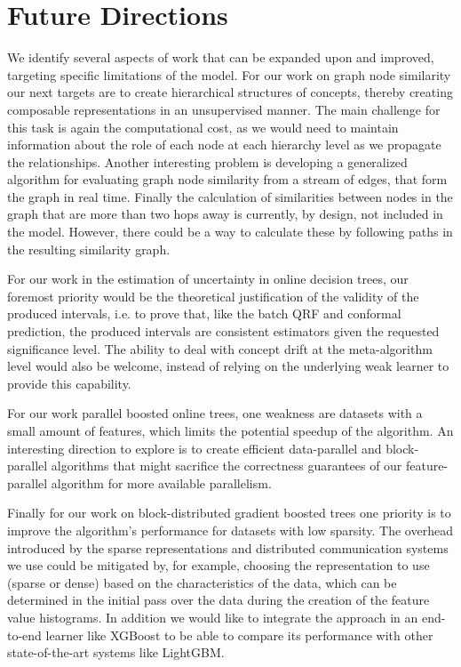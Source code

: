 \section{Future Directions}

We identify several aspects of work that can be expanded upon and improved,
targeting specific limitations of the model. For our work on graph node similarity
our next targets are to create hierarchical structures of concepts, thereby creating
composable representations in an unsupervised manner. The main challenge for this
task is again the computational cost, as we would need to maintain information
about the role of each node at each hierarchy level as we propagate the relationships.
Another interesting problem is developing
a generalized algorithm for evaluating graph node similarity from a stream of edges,
that form the graph in real time. Finally the calculation of similarities between
nodes in the graph that are more than two hops away is currently, by design, not included
in the model. However, there could be a way to calculate these by following paths in
the resulting similarity graph.

For our work in the estimation of uncertainty in online decision trees, our foremost
priority would be the theoretical justification of the validity of the produced intervals,
i.e. to prove that, like the batch QRF and conformal prediction, the produced intervals
are consistent estimators given the requested significance level. The ability to
deal with concept drift at the meta-algorithm level would also be welcome, instead
of relying on the underlying weak learner to provide this capability.

For our work parallel boosted online trees, one weakness are datasets with
a small amount of features, which limits the potential speedup of the
algorithm.
An interesting direction to explore is to
create efficient data-parallel and block-parallel algorithms that might sacrifice
the correctness guarantees of our feature-parallel algorithm for more available
parallelism.

Finally for our work on block-distributed gradient boosted trees one priority is to
improve the algorithm's performance for datasets with low sparsity. The overhead
introduced by the sparse representations and distributed communication systems we use could be mitigated by,
for example, choosing the representation to use (sparse or dense) based on the
characteristics of the data, which can be determined in the initial pass over the
data during the creation of the feature value histograms. In addition we would
like to integrate the approach in an end-to-end learner like XGBoost to be able
to compare its performance with other state-of-the-art systems like LightGBM.
